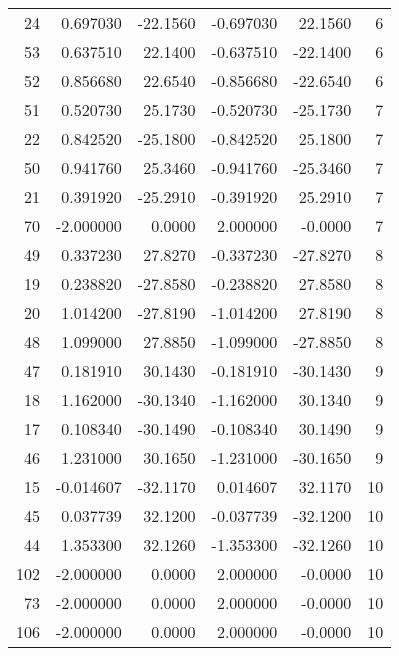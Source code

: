 \begin{tabular}{rrrrrr}
 24 &  0.697030 & -22.1560 &   -0.697030 &     22.1560 &   6 \\
 53 &  0.637510 &  22.1400 &   -0.637510 &    -22.1400 &   6 \\
 52 &  0.856680 &  22.6540 &   -0.856680 &    -22.6540 &   6 \\
 51 &  0.520730 &  25.1730 &   -0.520730 &    -25.1730 &   7 \\
 22 &  0.842520 & -25.1800 &   -0.842520 &     25.1800 &   7 \\
 50 &  0.941760 &  25.3460 &   -0.941760 &    -25.3460 &   7 \\
 21 &  0.391920 & -25.2910 &   -0.391920 &     25.2910 &   7 \\
 70 & -2.000000 &   0.0000 &    2.000000 &     -0.0000 &   7 \\
 49 &  0.337230 &  27.8270 &   -0.337230 &    -27.8270 &   8 \\
 19 &  0.238820 & -27.8580 &   -0.238820 &     27.8580 &   8 \\
 20 &  1.014200 & -27.8190 &   -1.014200 &     27.8190 &   8 \\
 48 &  1.099000 &  27.8850 &   -1.099000 &    -27.8850 &   8 \\
 47 &  0.181910 &  30.1430 &   -0.181910 &    -30.1430 &   9 \\
 18 &  1.162000 & -30.1340 &   -1.162000 &     30.1340 &   9 \\
 17 &  0.108340 & -30.1490 &   -0.108340 &     30.1490 &   9 \\
 46 &  1.231000 &  30.1650 &   -1.231000 &    -30.1650 &   9 \\
 15 & -0.014607 & -32.1170 &    0.014607 &     32.1170 &  10 \\
 45 &  0.037739 &  32.1200 &   -0.037739 &    -32.1200 &  10 \\
 44 &  1.353300 &  32.1260 &   -1.353300 &    -32.1260 &  10 \\
102 & -2.000000 &   0.0000 &    2.000000 &     -0.0000 &  10 \\
 73 & -2.000000 &   0.0000 &    2.000000 &     -0.0000 &  10 \\
106 & -2.000000 &   0.0000 &    2.000000 &     -0.0000 &  10 \\
\bottomrule
\end{tabular}
